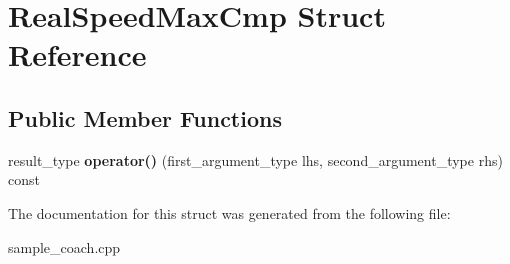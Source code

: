 \hypertarget{structRealSpeedMaxCmp}{
\section{RealSpeedMaxCmp Struct Reference}
\label{structRealSpeedMaxCmp}
}
\subsection*{Public Member Functions}
\begin{DoxyCompactItemize}
\item 
\hypertarget{structRealSpeedMaxCmp_ae17aea2dd13860ea1bdd061c604399e3}{
result\_\-type {\bfseries operator()} (first\_\-argument\_\-type lhs, second\_\-argument\_\-type rhs) const }
\label{structRealSpeedMaxCmp_ae17aea2dd13860ea1bdd061c604399e3}

\end{DoxyCompactItemize}


The documentation for this struct was generated from the following file:\begin{DoxyCompactItemize}
\item 
sample\_\-coach.cpp\end{DoxyCompactItemize}

